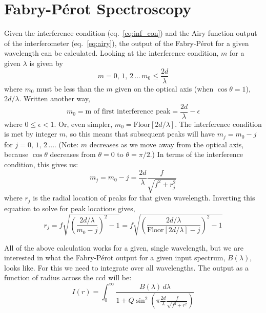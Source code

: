 \documentclass{article}
\begin{document}

\section{Fabry-P\'{e}rot Spectroscopy}
Given the interference condition (eq.~\ref{eq:inf_con}) and the Airy function output of the interferometer (eq.~\ref{eq:airy}), the output of the Fabry-P\'{e}rot for a given wavelength can be calculated. Looking at the interference condition, $m$ for a given $\lambda$ is given by 
\begin{equation}
m = 0,\,1,\,2\,...\,m_{0}\leq\frac{2d}{\lambda}
\end{equation}
where $m_{0}$ must be less than the $m$ given on the optical axis (when $\cos{\theta}=1$), $2d/\lambda$. Written another way,
\begin{equation}
m_{0} = \text{m of first interference peak} = \frac{2d}{\lambda} - \epsilon
\end{equation}
where $0\leq\epsilon<1$. Or, even simpler, $m_{0}=\text{Floor}[2d/\lambda]$. The interference condition is met by integer $m$, so this means that subsequent peaks will have $m_{j}=m_{0}-j$ for $j=0,\,1,\,2\,...$. (Note: $m$ decreases as we move away from the optical axis, because $\cos{\theta}$ decreases from $\theta=0$ to $\theta=\pi/2$.) In terms of the interference condition, this gives us:
\begin{equation}
m_{j}=m_{0}-j =\frac{2d}{\lambda}\frac{f}{\sqrt{f^{2}+r_{j}^{2}}}
\label{eq:mj}
\end{equation}
where $r_{j}$ is the radial location of peaks for that given wavelength. Inverting this equation to solve for peak locations gives,
\begin{equation}
r_{j} = f\sqrt{\left(\frac{2d/\lambda}{m_{0}-j}\right)^{2}-1}=f\sqrt{\left(\frac{2d/\lambda}{\text{Floor}[2d/\lambda]-j}\right)^{2}-1}
\end{equation}

All of the above calculation works for a given, single wavelength, but we are interested in what the Fabry-P\'{e}rot output for a given input spectrum, $B(\lambda)$, looks like. For this we need to integrate over all wavelengths. The output as a function of radius across the ccd will be:
\begin{equation}
I(r) = \int_{0}^{\infty} \frac{B(\lambda)\,d\lambda}{1+Q\sin^{2}{\left(\pi \frac{2d}{\lambda}\frac{f}{\sqrt{f^{2}+r^{2}}}\right)}}
\label{eq:pattern}
\end{equation}
\end{document}
